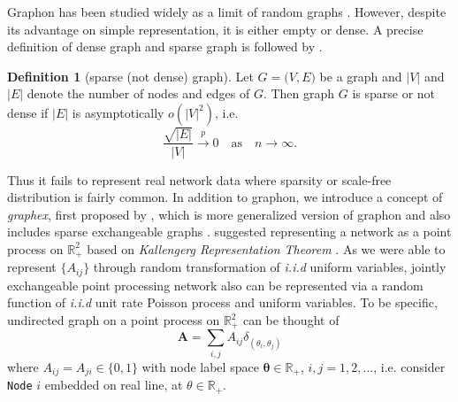 \documentclass[12pt]{article}
\theoremstyle{definition}
\newtheorem{definition}{Definition}[section]
\begin{document}
Graphon has been studied widely as a limit of random graphs \citep{lovasz2006limits}. However, despite its advantage on simple representation, it is either empty or dense. A precise definition of dense graph and sparse graph is followed by \cite{veitch2015class}. 
\begin{definition}[sparse (not dense) graph]
Let $G = \big(  V, E \big)$ be a graph and $|V|$ and $|E|$ denote the number of nodes and edges of $G$. Then graph $G$ is sparse or not dense if $|E|$ is asymptotically $o(|V|^2)$, i.e.
\begin{equation}
\frac{\sqrt{|E|}}{|V|} \xrightarrow{p} 0 \quad \mbox{as} \quad n \rightarrow \infty.
\end{equation}
\end{definition}
Thus it fails to represent real network data where sparsity or scale-free distribution is fairly common. In addition to graphon, we introduce a concept of \textit{graphex}, first proposed by \cite{veitch2015class}, which is more generalized version of graphon and also includes sparse exchangeable graphs \citep{caron2014sparse}.  \cite{caron2014sparse} suggested representing a network as a point process on $\mathbb{R}^2_{+}$ based on \textit{Kallengerg Representation Theorem} \citep{kallenberg1990exchangeable}. As we were able to represent $\{ A_{ij} \}$ through random transformation of \textit{i.i.d} uniform variables, jointly exchangeable point processing network also can be represented via a random function of \textit{i.i.d} unit rate Poisson process and uniform variables. 
To be specific, undirected graph on a point process on $\mathbb{R}^2_{+}$ can be thought of 
\begin{equation}
\mathbf{A} = \sum\limits_{i,j} A_{ij} \delta_{( \theta_{i}, \theta_{j})} 
\end{equation}	
where $A_{ij} = A_{ji} \in \{ 0 , 1  \}$ with node label space $\mathbf{\theta} \in \mathbb{R}_{+}$, $i,j = 1,2,...$, i.e. consider \texttt{Node} $i$ embedded on real line, at $\theta \in \mathbb{R}_{+}$. 	
				
\end{document}
